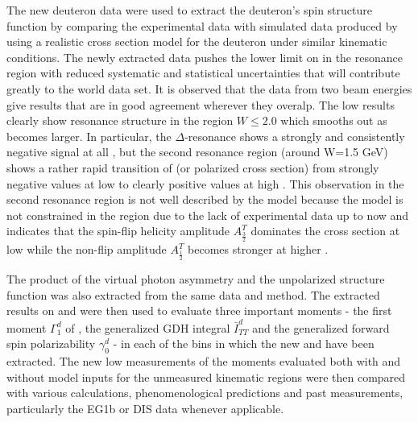 The new deuteron data were used to extract the deuteron's spin structure function \gones by 
comparing the experimental data with simulated data produced by using a 
realistic cross section model for the deuteron under similar kinematic conditions. %
%
The newly extracted data pushes the lower limit on \qsqs in the resonance region with reduced 
systematic and statistical uncertainties that will contribute greatly to the world data set. 
It is observed that the data from two beam energies give results that are in good agreement 
wherever they overalp. The low \qsqs results clearly show resonance structure in the region 
$W \le 2.0$ which smooths out as \qsqs becomes larger. In particular, the $\Delta$-resonance 
shows a strongly and consistently negative signal at all \qsq, but the second resonance region 
(around W=1.5 GeV) shows a rather %
rapid transition of \gones (or polarized cross section) from 
strongly negative values at low \qsqs to clearly positive values at high \qsq. 
This observation in the second resonance region 
is not well described by the model because the model is not constrained in the region due to the lack 
of experimental data up to now and indicates that the spin-flip helicity amplitude $A^T_{\frac{3}{2}}$ dominates 
the cross section at low \qsqs while the non-flip amplitude $A^T_{\frac{1}{2}}$ becomes stronger 
at higher \qsq.


The product \afones of the virtual photon asymmetry \aones and the unpolarized structure function 
\fones was also extracted from the same %
data %
and method.
The extracted results on \gones and \afones were then used to evaluate %
three important moments - the first moment $\Gamma^d_1$ of \gone, the generalized GDH integral $\bar{I}^d_{TT}$ and the generalized forward spin polarizability $\gamma^d_0$ - in each of the \qsqs bins in which the new \gones and \afones have been extracted. The new low \qsqs measurements of the moments evaluated both with and without model inputs for the unmeasured kinematic regions were then compared with various \chipts calculations, phenomenological predictions and past measurements, particularly the EG1b or DIS data whenever applicable.


